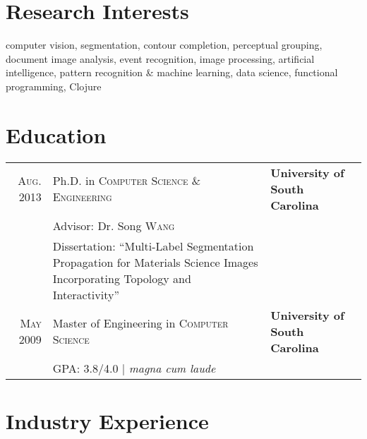\documentclass[10pt]{article}
\begin{document}
\section{Research Interests}

computer vision, segmentation, contour completion, perceptual
grouping, document image analysis, event recognition, image
processing, artificial intelligence, pattern recognition \& machine
learning, data science, functional programming, Clojure

\section{Education}
\begin{tabularx}{\linewidth}{@{}r X l}
  \textsc{Aug. 2013} & Ph.D. in \textsc{Computer Science \& Engineering} & \textbf{University of South Carolina}\\
  & \small Advisor: Dr. Song \textsc{Wang} & \\%
  & \footnotesize Dissertation: ``Multi-Label Segmentation Propagation for Materials Science Images Incorporating Topology and Interactivity'' & \\[4ex]%
  \textsc{May} 2009 & Master of Engineering in \textsc{Computer Science} & \textbf{University of South Carolina}\\
  &\normalsize \textsc{GPA}: 3.8/4.0 | \small\emph{magna cum laude} \\[1ex]%
\end{tabularx}

\newcommand{\experience}[4]{
\textsc{#1} & #2 \\
\nopagebreak &\emph{#3}\\
\nopagebreak &\footnotesize{#4} \\
\nopagebreak \multicolumn{2}{c}{} \\ [-1ex]
}

\section{Industry Experience}
\vspace{-1em}
\newcommand{\industry}[4]{
\textsc{#1} & #2 &\emph{#3}\\
&\multicolumn{2}{p{14cm}}{\footnotesize{#4}}\\
\multicolumn{3}{c}{} \\ [-1ex]
}
\end{document}
